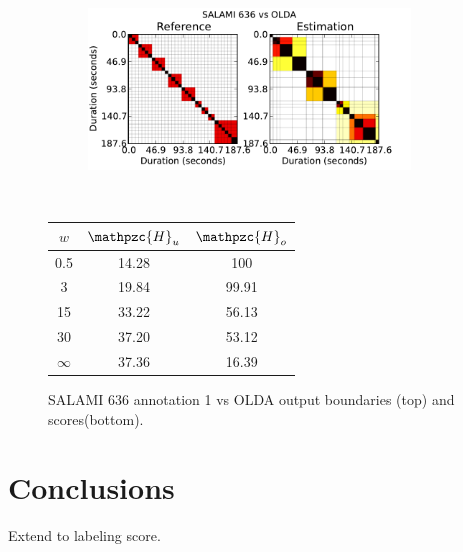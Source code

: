 \documentclass{article}
\begin{document}
\begin{figure}
  \centering
  \begin{subfigure}{0.5\textwidth}
    \centering
    \includegraphics[width=0.94\textwidth]{plots/SALAMI-OLDA.pdf}
  \end{subfigure}%
  \\
  \begin{minipage}{0.5\textwidth}
    \centering
    \vspace{10pt}
    \begin{tabular}{|c|c|c|}
      \hline
      $w$       & $\mathpzc{H}_u$       & $\mathpzc{H}_o$      \\
      \hline
      0.5       & 14.28       & 100      \\     
      3         & 19.84       & 99.91      \\
      15        & 33.22       & 56.13    \\
      30        & 37.20       & 53.12    \\
      $\infty$  & 37.36       & 16.39    \\
      \hline
    \end{tabular}
  \end{minipage}
  \caption{SALAMI 636 annotation 1 vs OLDA output boundaries (top) and scores(bottom).}
  \label{fig:SALAMI-OLDA}
\end{figure}




\section{Conclusions}\label{sec:conclusions}

Extend to labeling score.



%
\end{document}
